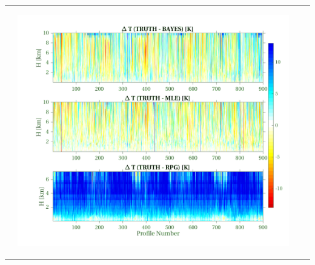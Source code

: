 \documentclass[landscape,paperwidth=1189mm,paperheight=841mm,fontscale=0.4,margin=.7cm]{baposter}
\begin{document}
\begin{poster}
{\begin{tabular}{ll|ll}
\begin{minipage}{0.14\linewidth}
\begin{center}
		\end{center}
	\end{minipage}
	
	&
	\hspace*{-3em}
	\begin{minipage}{0.35\linewidth}
		\begin{center}             
			\includegraphics[width=.99\linewidth]{Temp_BAY_MLE_RPG_series.png}
		\end{center}
	\end{minipage}
	&
	\begin{minipage}{0.14\linewidth}
		\begin{center}

\end{center}
\end{minipage}
\end{tabular}}
\end{poster}
\end{document}
